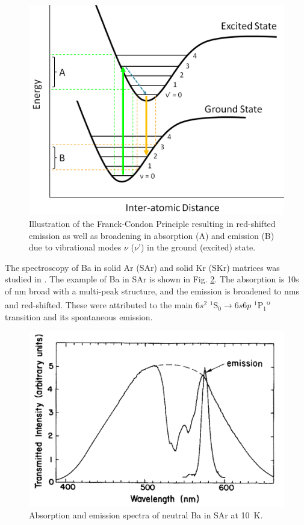 
\begin{figure} %
        \centering
                \includegraphics[width=.7\textwidth]{figures/FranckCondon.png}
                \caption{Illustration of the Franck-Condon Principle resulting in red-shifted emission as well as broadening in absorption (A) and emission (B) due to vibrational modes $\nu$ ($\nu$') in the ground (excited) state.}
\label{fig:FranckCondon}
\end{figure}


The spectroscopy of Ba in solid Ar (SAr) and solid Kr (SKr) matrices was studied in \cite{SAr}.  The example of Ba in SAr is shown in Fig. \ref{fig:BaSAr}.  The absorption is 10s of nm broad with a multi-peak structure, and the emission is broadened to nms and red-shifted.  These were attributed to the main $6s^{2}$ $^{1}$S$_{0} \rightarrow 6s6p$ $^{1}$P$_{1}$\textsuperscript{o} transition and its spontaneous emission.

\begin{figure} %
        \centering
                \includegraphics[width=.7\textwidth]{figures/Ba_in_SAr.png}
                \caption{Absorption and emission spectra of neutral Ba in SAr at 10~K.  \cite{SAr}}
\label{fig:BaSAr}
\end{figure}

